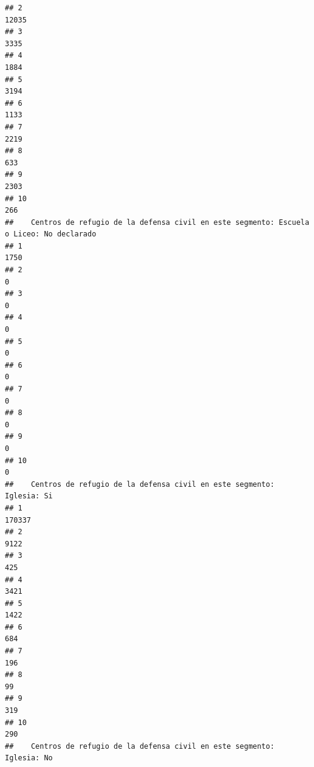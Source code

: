 \documentclass[11pt,]{article}
\begin{document}
\begin{verbatim}
## 2                                                                         12035
## 3                                                                          3335
## 4                                                                          1884
## 5                                                                          3194
## 6                                                                          1133
## 7                                                                          2219
## 8                                                                           633
## 9                                                                          2303
## 10                                                                          266
##    Centros de refugio de la defensa civil en este segmento: Escuela o Liceo: No declarado
## 1                                                                                    1750
## 2                                                                                       0
## 3                                                                                       0
## 4                                                                                       0
## 5                                                                                       0
## 6                                                                                       0
## 7                                                                                       0
## 8                                                                                       0
## 9                                                                                       0
## 10                                                                                      0
##    Centros de refugio de la defensa civil en este segmento: Iglesia: Si
## 1                                                                170337
## 2                                                                  9122
## 3                                                                   425
## 4                                                                  3421
## 5                                                                  1422
## 6                                                                   684
## 7                                                                   196
## 8                                                                    99
## 9                                                                   319
## 10                                                                  290
##    Centros de refugio de la defensa civil en este segmento: Iglesia: No

\end{verbatim}
\end{document}
